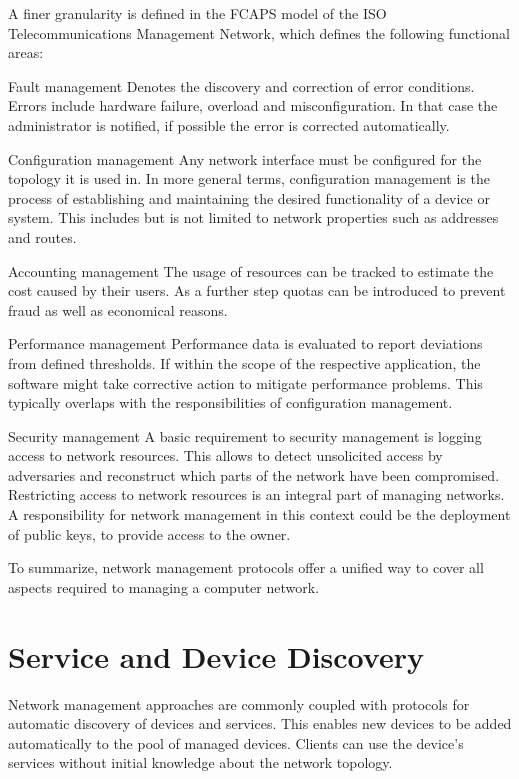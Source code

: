 \documentclass[conference]{IEEEtran}
\begin{document}
   A finer granularity is defined in the FCAPS model of the ISO Telecommunications Management Network, which defines the following functional areas:
  \begin{LaTeXdescription}
    \item[Fault management] 
    Denotes the discovery and correction of error conditions. Errors include hardware failure, overload and misconfiguration. In that case the administrator is notified, if possible the error is corrected automatically.
    \item[Configuration management] 
    Any network interface must be configured for the topology it is used in. In more general terms, configuration management is the process of establishing and maintaining the desired functionality of a device or system. This includes but is not limited to network properties such as addresses and routes.
    \item[Accounting management] 
    The usage of resources can be tracked to estimate the cost caused by their users. As a further step quotas can be introduced to prevent fraud as well as economical reasons.
    \item[Performance management] 
    Performance data is evaluated to report deviations from defined thresholds. If within the scope of the respective application, the software might take corrective action to mitigate performance problems. This typically overlaps with the responsibilities of configuration management.
    \item[Security management]
    A basic requirement to security management is logging access to network resources. This allows to detect unsolicited access by adversaries and reconstruct which parts of the network have been compromised.
    Restricting access to network resources is an integral part of managing networks. A responsibility for network management in this context could be the deployment of public keys, to provide access to the owner. 
  \end{LaTeXdescription}

  To summarize, network management protocols offer a unified way to cover all aspects required to managing a computer network.  

\section{Service and Device Discovery} %
\label{sub:service_and_device_discovery}
Network management approaches are commonly coupled with protocols for automatic discovery of devices and services. This enables new devices to be added automatically to the pool of managed devices. Clients can use the device's services without initial knowledge about the network topology. 
\end{document}
